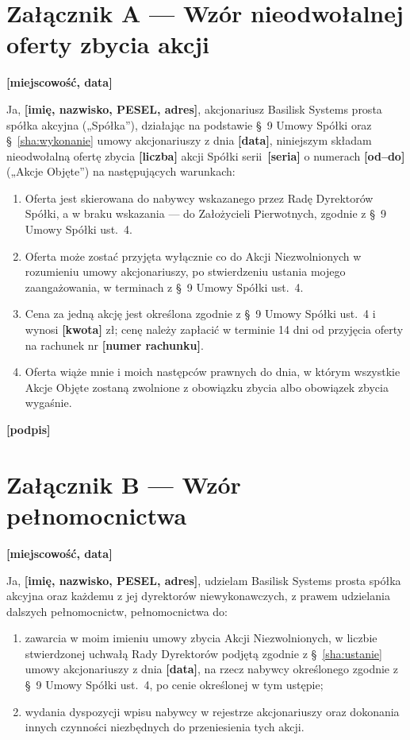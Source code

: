 \documentclass[12pt,a4paper]{report}
\newcommand{\field}[1]{\textbf{[#1]}}
\newcommand{\CompanyFull}{Basilisk Systems prosta spółka akcyjna}
\newcommand{\US}[1]{§~#1 Umowy Spółki}
\begin{document}
\newpage
\section*{Załącznik A --- Wzór nieodwołalnej oferty zbycia akcji}

\field{miejscowość, data}

Ja, \field{imię, nazwisko, PESEL, adres}, akcjonariusz \CompanyFull{} („Spółka”), działając na podstawie \US{9} oraz §~\ref{sha:wykonanie} umowy akcjonariuszy z dnia \field{data}, niniejszym składam nieodwołalną ofertę zbycia \field{liczba} akcji Spółki serii~\field{seria} o numerach \field{od--do} („Akcje Objęte”) na następujących warunkach:

\begin{enumerate}
  \item Oferta jest skierowana do nabywcy wskazanego przez Radę Dyrektorów Spółki, a w braku wskazania --- do Założycieli Pierwotnych, zgodnie z \US{9} ust.~4.
  \item Oferta może zostać przyjęta wyłącznie co do Akcji Niezwolnionych w rozumieniu umowy akcjonariuszy, po stwierdzeniu ustania mojego zaangażowania, w terminach z \US{9} ust.~4.
  \item Cena za jedną akcję jest określona zgodnie z \US{9} ust.~4 i wynosi \field{kwota} zł; cenę należy zapłacić w terminie 14 dni od przyjęcia oferty na rachunek nr \field{numer rachunku}.
  \item Oferta wiąże mnie i moich następców prawnych do dnia, w którym wszystkie Akcje Objęte zostaną zwolnione z obowiązku zbycia albo obowiązek zbycia wygaśnie.
\end{enumerate}

\field{podpis}

\newpage
\section*{Załącznik B --- Wzór pełnomocnictwa}

\field{miejscowość, data}

Ja, \field{imię, nazwisko, PESEL, adres}, udzielam \CompanyFull{} oraz każdemu z jej dyrektorów niewykonawczych, z prawem udzielania dalszych pełnomocnictw, pełnomocnictwa do:

\begin{enumerate}
  \item zawarcia w moim imieniu umowy zbycia Akcji Niezwolnionych, w liczbie stwierdzonej uchwałą Rady Dyrektorów podjętą zgodnie z §~\ref{sha:ustanie} umowy akcjonariuszy z dnia \field{data}, na rzecz nabywcy określonego zgodnie z \US{9} ust.~4, po cenie określonej w tym ustępie;
  \item wydania dyspozycji wpisu nabywcy w rejestrze akcjonariuszy oraz dokonania innych czynności niezbędnych do przeniesienia tych akcji.
\end{enumerate}
\end{document}
